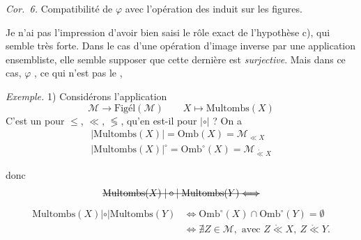 \documentclass[11pt,a4paper]{article}
\begin{document}
\emph{Cor.~6.} Compatibilité de $\varphi$ avec l'opération des
 induit sur les figures.

Je n'ai pas l'impression d'avoir bien saisi le rôle exact de l'hypothèse c), qui
semble très forte. Dans le cas d'une opération d'image inverse
\uncertain{\ill{}} par une application ensembliste, elle semble supposer
que cette dernière est \emph{surjective}. Mais dans ce cas, $\varphi$
  , ce qui n'est pas 
 le   ,
\struck{\ill{} \ill{}}


\emph{Exemple.} 1) Considérons l'application
\[
  \mathcal{M} \longrightarrow \text{Figél}(\mathcal{M}) \qquad
  X \longmapsto \mathrm{Multombs}(X)
\]
C'est un   pour $\leq$, $\ll$,
$\lessgtr$, qu'en est-il pour $|\circ|$ ?
On a
\[
  \begin{array}{l}
    |\mathrm{Multombs}(X)| = \mathrm{Omb}(X) = \mathcal{M}_{\ll X} \\
    |\mathrm{Multombs}(X)|^{\circ} = \mathrm{Omb}^{\circ}(X) =
      \mathcal{M}_{\mathring{\ll} X}
  \end{array}
\]

donc
\[
  \text{\struck{$\mathrm{Multombs}(X) \mathrel{|\circ|} \mathrm{Multombs}(Y) \Longleftrightarrow$}}
\]
\[
  \begin{array}{rl}
    \mathrm{Multombs}(X) \mathrel{|\circ|} \mathrm{Multombs}(Y)
    & \Longleftrightarrow \mathrm{Omb}^{\circ}(X) \cap \mathrm{Omb}^{\circ}(Y) = \emptyset \\
    & \Longleftrightarrow \nexists Z \in \mathcal{M}, \text{ avec }
      Z \mathrel{\mathring{\ll}} X,\ Z \mathrel{\mathring{\ll}} Y .
  \end{array}
\]
\end{document}
